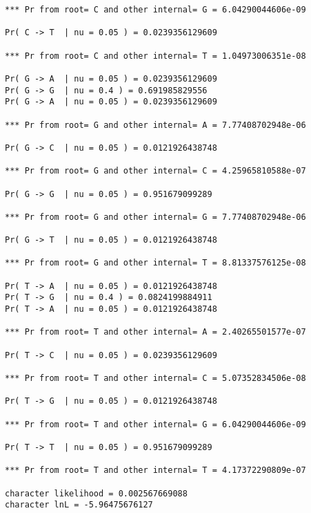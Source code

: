 \documentclass[landscape]{foils}
\begin{document}
\begin{verbatim}
*** Pr from root= C and other internal= G = 6.04290044606e-09 

Pr( C -> T  | nu = 0.05 ) = 0.0239356129609

*** Pr from root= C and other internal= T = 1.04973006351e-08 

Pr( G -> A  | nu = 0.05 ) = 0.0239356129609
Pr( G -> G  | nu = 0.4 ) = 0.691985829556
Pr( G -> A  | nu = 0.05 ) = 0.0239356129609

*** Pr from root= G and other internal= A = 7.77408702948e-06 

Pr( G -> C  | nu = 0.05 ) = 0.0121926438748

*** Pr from root= G and other internal= C = 4.25965810588e-07 

Pr( G -> G  | nu = 0.05 ) = 0.951679099289

*** Pr from root= G and other internal= G = 7.77408702948e-06 

Pr( G -> T  | nu = 0.05 ) = 0.0121926438748

*** Pr from root= G and other internal= T = 8.81337576125e-08 

Pr( T -> A  | nu = 0.05 ) = 0.0121926438748
Pr( T -> G  | nu = 0.4 ) = 0.0824199884911
Pr( T -> A  | nu = 0.05 ) = 0.0121926438748

*** Pr from root= T and other internal= A = 2.40265501577e-07 

Pr( T -> C  | nu = 0.05 ) = 0.0239356129609

*** Pr from root= T and other internal= C = 5.07352834506e-08 

Pr( T -> G  | nu = 0.05 ) = 0.0121926438748

*** Pr from root= T and other internal= G = 6.04290044606e-09 

Pr( T -> T  | nu = 0.05 ) = 0.951679099289

*** Pr from root= T and other internal= T = 4.17372290809e-07 

character likelihood = 0.002567669088
character lnL = -5.96475676127
\end{verbatim}
\myNewSlide
\end{document}
